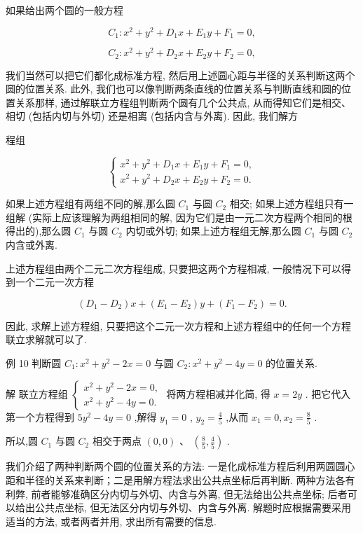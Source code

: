\documentclass[10pt]{article}
\begin{document}
如果给出两个圆的一般方程

\[
{C}_{1} : {x}^{2} + {y}^{2} + {D}_{1}x + {E}_{1}y + {F}_{1} = 0,
\]

\[
{C}_{2} : {x}^{2} + {y}^{2} + {D}_{2}x + {E}_{2}y + {F}_{2} = 0,
\]

我们当然可以把它们都化成标准方程, 然后用上述圆心距与半径的关系判断这两个圆的位置关系. 此外, 我们也可以像判断两条直线的位置关系与判断直线和圆的位置关系那样, 通过解联立方程组判断两个圆有几个公共点, 从而得知它们是相交、相切 (包括内切与外切) 还是相离 (包括内含与外离). 因此, 我们解方

程组

\[
\left\{  \begin{array}{l} {x}^{2} + {y}^{2} + {D}_{1}x + {E}_{1}y + {F}_{1} = 0, \\  {x}^{2} + {y}^{2} + {D}_{2}x + {E}_{2}y + {F}_{2} = 0. \end{array}\right.
\]

如果上述方程组有两组不同的解,那么圆 \({C}_{1}\) 与圆 \({C}_{2}\) 相交; 如果上述方程组只有一组解 (实际上应该理解为两组相同的解, 因为它们是由一元二次方程两个相同的根得出的),那么圆 \({C}_{1}\) 与圆 \({C}_{2}\) 内切或外切; 如果上述方程组无解,那么圆 \({C}_{1}\) 与圆 \({C}_{2}\) 内含或外离.

上述方程组由两个二元二次方程组成, 只要把这两个方程相减, 一般情况下可以得到一个二元一次方程

\[
\left( {{D}_{1} - {D}_{2}}\right) x + \left( {{E}_{1} - {E}_{2}}\right) y + \left( {{F}_{1} - {F}_{2}}\right)  = 0.
\]

因此, 求解上述方程组, 只要把这个二元一次方程和上述方程组中的任何一个方程联立求解就可以了.

例 10 判断圆 \({C}_{1} : {x}^{2} + {y}^{2} - {2x} = 0\) 与圆 \({C}_{2} : {x}^{2} + {y}^{2} - {4y} = 0\) 的位置关系.

解 联立方程组 \(\left\{  \begin{array}{l} {x}^{2} + {y}^{2} - {2x} = 0, \\  {x}^{2} + {y}^{2} - {4y} = 0. \end{array}\right.\) 将两方程相减并化简, 得 \(x = {2y}\) . 把它代入第一个方程得到 \(5{y}^{2} - {4y} = 0\) ,解得 \({y}_{1} = 0\) , \({y}_{2} = \frac{4}{5}\) ,从而 \({x}_{1} = 0,{x}_{2} = \frac{8}{5}\) .

所以,圆 \({C}_{1}\) 与圆 \({C}_{2}\) 相交于两点 \(\left( {0,0}\right) \text{ 、 }\left( {\frac{8}{5},\frac{4}{5}}\right)\) .

我们介绍了两种判断两个圆的位置关系的方法: 一是化成标准方程后利用两圆圆心距和半径的关系来判断；二是用解方程法求出公共点坐标后再判断. 两种方法各有利弊, 前者能够准确区分内切与外切、内含与外离, 但无法给出公共点坐标; 后者可以给出公共点坐标, 但无法区分内切与外切、内含与外离. 解题时应根据需要采用适当的方法, 或者两者并用, 求出所有需要的信息.
\end{document}
